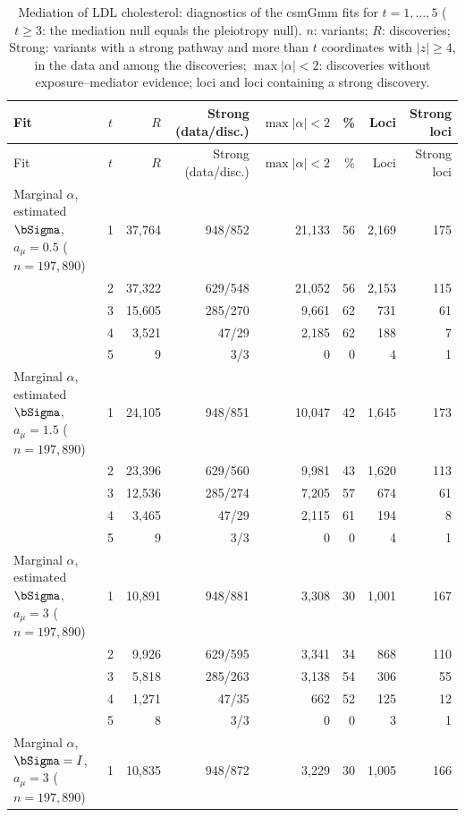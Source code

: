{\scriptsize\setlength{\tabcolsep}{3pt}
\begin{longtable}{l c rr rr rr}
\caption{Mediation of LDL cholesterol: diagnostics of the csmGmm fits for $t=1,\ldots,5$ ($t\ge3$: the mediation null equals the pleiotropy null). $n$: variants; $R$: discoveries; Strong: variants with a strong pathway and more than $t$ coordinates with $|z|\ge4$, in the data and among the discoveries; $\max|\alpha|<2$: discoveries without exposure--mediator evidence; loci and loci containing a strong discovery.}\label{tab:med-ldl-diag}\\
\toprule
Fit & $t$ & $R$ & Strong (data/disc.) & $\max|\alpha|<2$ & \% & Loci & Strong loci\\
\midrule
\endfirsthead
\toprule
Fit & $t$ & $R$ & Strong (data/disc.) & $\max|\alpha|<2$ & \% & Loci & Strong loci\\
\midrule
\endhead
\bottomrule
\endfoot
Marginal $\alpha$, estimated $\bSigma$, $a_\mu=0.5$ ($n=197{,}890$) & 1 & 37{,}764 & 948/852 & 21{,}133 & 56 & 2{,}169 & 175\\
 & 2 & 37{,}322 & 629/548 & 21{,}052 & 56 & 2{,}153 & 115\\
 & 3 & 15{,}605 & 285/270 & 9{,}661 & 62 & 731 & 61\\
 & 4 & 3{,}521 & 47/29 & 2{,}185 & 62 & 188 & 7\\
 & 5 & 9 & 3/3 & 0 & 0 & 4 & 1\\
\midrule
Marginal $\alpha$, estimated $\bSigma$, $a_\mu=1.5$ ($n=197{,}890$) & 1 & 24{,}105 & 948/851 & 10{,}047 & 42 & 1{,}645 & 173\\
 & 2 & 23{,}396 & 629/560 & 9{,}981 & 43 & 1{,}620 & 113\\
 & 3 & 12{,}536 & 285/274 & 7{,}205 & 57 & 674 & 61\\
 & 4 & 3{,}465 & 47/29 & 2{,}115 & 61 & 194 & 8\\
 & 5 & 9 & 3/3 & 0 & 0 & 4 & 1\\
\midrule
Marginal $\alpha$, estimated $\bSigma$, $a_\mu=3$ ($n=197{,}890$) & 1 & 10{,}891 & 948/881 & 3{,}308 & 30 & 1{,}001 & 167\\
 & 2 & 9{,}926 & 629/595 & 3{,}341 & 34 & 868 & 110\\
 & 3 & 5{,}818 & 285/263 & 3{,}138 & 54 & 306 & 55\\
 & 4 & 1{,}271 & 47/35 & 662 & 52 & 125 & 12\\
 & 5 & 8 & 3/3 & 0 & 0 & 3 & 1\\
\midrule
Marginal $\alpha$, $\bSigma=I$, $a_\mu=3$ ($n=197{,}890$) & 1 & 10{,}835 & 948/872 & 3{,}229 & 30 & 1{,}005 & 166\\

\end{longtable}}
